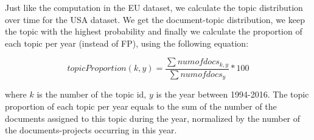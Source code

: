 \documentclass[12pt]{report}
\begin{document}
Just like the computation in the EU dataset, we calculate the topic 
distribution over time for the USA dataset. We get the document-topic 
distribution, we keep the topic with the highest probability and finally 
we calculate the proportion of each topic per
year (instead of FP), using the following equation:

\begin{equation}
topicProportion(k, y) = \frac{\sum num of docs_{k,y}}{\sum num of docs_{y}} * 100
\end{equation}

where $k$ is the number of the topic id, $y$ is the year between 1994-2016. The
topic proportion of each topic per year equals to the sum of the number of the
documents assigned to this topic during the year, normalized by the number of
the documents-projects  occurring in this year.
\end{document}
